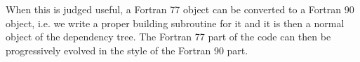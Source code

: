 \documentclass[a4paper,11pt]{article}
\begin{document}
When this is judged useful, a Fortran 77 object can be converted to a Fortran 90 object, i.e. we write a proper building subroutine for it and it is then a normal object of the dependency tree. The Fortran 77 part of the code can then be progressively evolved in the style of the Fortran 90 part.



{}


\end{document}
